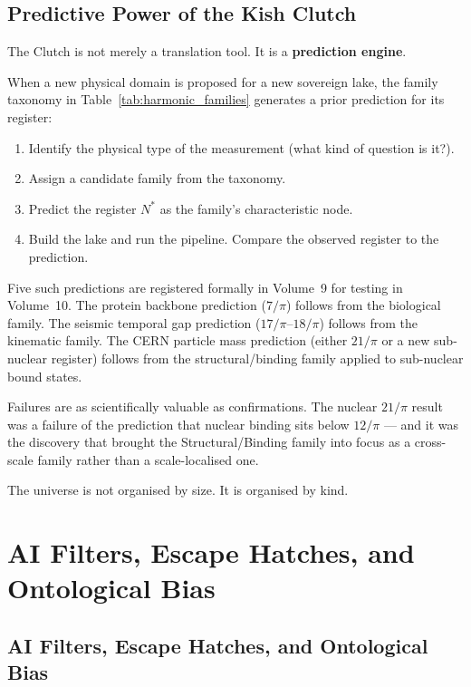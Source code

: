 \documentclass[12pt,oneside]{book}
\begin{document}
\section{Predictive Power of the Kish Clutch}

The Clutch is not merely a translation tool. It is a \textbf{prediction engine}.

When a new physical domain is proposed for a new sovereign lake, the family taxonomy
in Table~\ref{tab:harmonic_families} generates a prior prediction for its register:

\begin{enumerate}
\item Identify the physical type of the measurement (what kind of question is it?).
\item Assign a candidate family from the taxonomy.
\item Predict the register $N^*$ as the family's characteristic node.
\item Build the lake and run the pipeline. Compare the observed register to the prediction.
\end{enumerate}

Five such predictions are registered formally in Volume~9 for testing in Volume~10.
The protein backbone prediction ($7/\pi$) follows from the biological family.
The seismic temporal gap prediction ($17/\pi$--$18/\pi$) follows from the kinematic
family. The CERN particle mass prediction (either $21/\pi$ or a new sub-nuclear register)
follows from the structural/binding family applied to sub-nuclear bound states.

Failures are as scientifically valuable as confirmations. The nuclear $21/\pi$ result
was a failure of the prediction that nuclear binding sits below $12/\pi$ — and it was
the discovery that brought the Structural/Binding family into focus as a cross-scale
family rather than a scale-localised one.

The universe is not organised by size. It is organised by kind.

\clearpage

\chapter{AI Filters, Escape Hatches, and Ontological Bias}
\section{AI Filters, Escape Hatches, and Ontological Bias}
\end{document}
